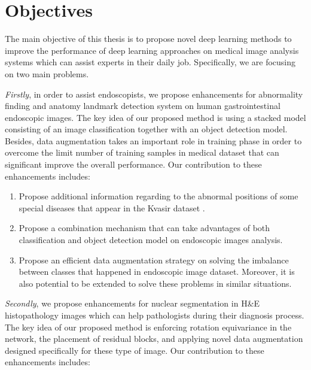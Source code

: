 \section{Objectives}

The main objective of this thesis is to propose novel deep learning methods to improve the performance of deep learning approaches on medical image analysis systems which can assist experts in their daily job. Specifically, we are focusing on two main problems.  

\textit{Firstly}, in order to assist endoscopists, we propose enhancements for abnormality finding and anatomy landmark detection system on human gastrointestinal endoscopic images. The key idea of our proposed method is using a stacked model consisting of an image classification together with an object detection model. Besides, data augmentation takes an important role in training phase in order to overcome the limit number of training samples in medical dataset that can significant improve the overall performance. Our contribution to these enhancements includes:

\begin{enumerate}
    \item Propose additional information regarding to the abnormal positions of some special diseases that appear in the Kvasir dataset \cite{Pogorelov:2017:KMI:3083187.3083212}. 
    \item Propose a combination mechanism that can take advantages of both classification and object detection model on endoscopic images analysis.
    \item Propose an efficient data augmentation strategy on solving the imbalance between classes that happened in endoscopic image dataset. Moreover, it is also potential to be extended to solve these problems in similar situations.
\end{enumerate}

\textit{Secondly}, we propose enhancements for nuclear segmentation in H\&E histopathology images which can help pathologists during their diagnosis process. The key idea of our proposed method is enforcing rotation equivariance in the network, the placement of residual blocks, and applying novel data augmentation designed specifically for these type of image. Our contribution to these enhancements includes:


